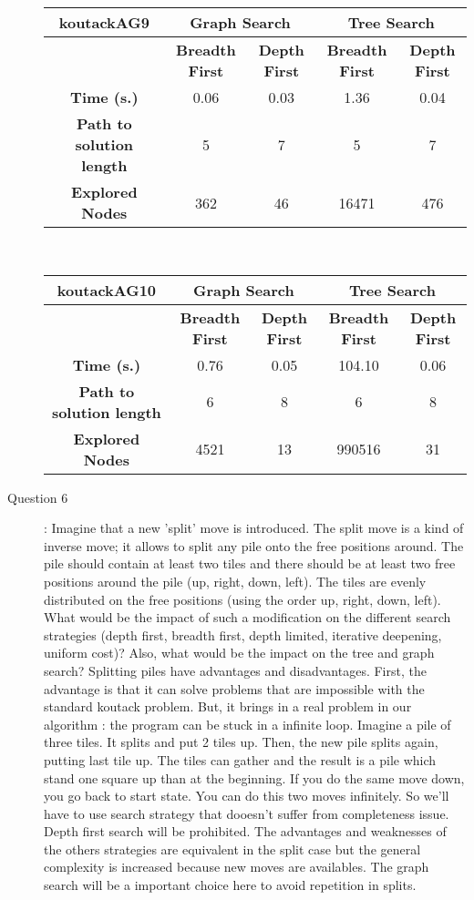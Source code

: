 \begin{description}
\begin{tabular}{|c|c|c|c|c|} 
\hline \textbf{koutackAG9} & \multicolumn{2}{|c|}{\textbf{Graph Search}} & \multicolumn{2}{|c|}{\textbf{Tree Search}} \\ \hline & \textbf{Breadth First} &  \textbf{Depth First} & \textbf{Breadth First} &  \textbf{Depth First}\\ 
\hline \textbf{Time (s.)} & 0.06 & 0.03 & 1.36 & 0.04\\ \textbf{Path to solution length} & 5 & 7 & 5 & 7 \\ \textbf{Explored Nodes} & 362 & 46 & 16471 & 476\\ 
\hline 
\end{tabular}\\
\begin{tabular}{|c|c|c|c|c|} 
\hline \textbf{koutackAG10} & \multicolumn{2}{|c|}{\textbf{Graph Search}} & \multicolumn{2}{|c|}{\textbf{Tree Search}} \\ \hline & \textbf{Breadth First} &  \textbf{Depth First} & \textbf{Breadth First} &  \textbf{Depth First}\\ 
\hline \textbf{Time (s.)} & 0.76 & 0.05 & 104.10 & 0.06\\ \textbf{Path to solution length} & 6 & 8 & 6 & 8 \\ \textbf{Explored Nodes} & 4521 & 13 & 990516 & 31\\ 
\hline 
\end{tabular}
\item[Question 6]: Imagine that a new ’split’ move is introduced. The split move is a kind of inverse move; it allows to split any pile onto the free positions around. The pile should contain at least two tiles and there should be at least two free positions around the pile (up, right, down, left). The tiles are evenly distributed on the free positions (using the order up, right, down, left). What would be the impact of such a modification on the different search strategies (depth first, breadth first, depth limited, iterative deepening, uniform cost)? Also, what would be the impact on the tree and graph search? \newline
Splitting piles have advantages and disadvantages. First, the advantage is that it can solve problems that are impossible with the standard koutack problem. But, it brings in a real problem in our algorithm : the program can be stuck in a infinite loop. Imagine a pile of three tiles. It splits and put 2 tiles up. Then, the new pile splits again, putting last tile up. The tiles can gather and the result is a pile which stand one square up than at the beginning. If you do the same move down, you go back to start state. You can do this two moves infinitely. So we'll have to use search strategy that dooesn't suffer from completeness issue. Depth first search will be prohibited. The advantages and weaknesses of the others strategies are equivalent in the split case but the general complexity is increased because new moves are availables. The graph search will be a important choice here to avoid repetition in splits.
\end{description}
